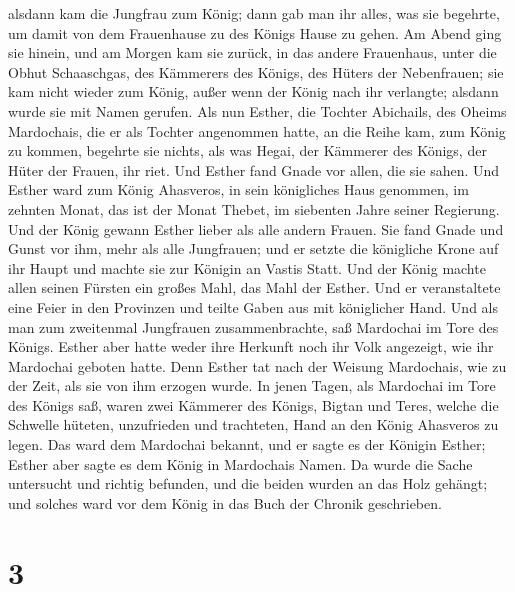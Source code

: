  alsdann kam die Jungfrau zum König; dann gab man ihr
alles, was sie begehrte, um damit von dem Frauenhause zu des Königs
Hause zu gehen.  Am Abend ging sie hinein, und am Morgen
kam sie zurück, in das andere Frauenhaus, unter die Obhut Schaaschgas,
des Kämmerers des Königs, des Hüters der Nebenfrauen; sie kam nicht
wieder zum König, außer wenn der König nach ihr verlangte; alsdann wurde
sie mit Namen gerufen.  Als nun Esther, die Tochter
Abichails, des Oheims Mardochais, die er als Tochter angenommen hatte,
an die Reihe kam, zum König zu kommen, begehrte sie nichts, als was
Hegai, der Kämmerer des Königs, der Hüter der Frauen, ihr riet. Und
Esther fand Gnade vor allen, die sie sahen.  Und Esther
ward zum König Ahasveros, in sein königliches Haus genommen, im zehnten
Monat, das ist der Monat Thebet, im siebenten Jahre seiner Regierung.
 Und der König gewann Esther lieber als alle andern
Frauen. Sie fand Gnade und Gunst vor ihm, mehr als alle Jungfrauen; und
er setzte die königliche Krone auf ihr Haupt und machte sie zur Königin
an Vastis Statt.  Und der König machte allen seinen
Fürsten ein großes Mahl, das Mahl der Esther. Und er veranstaltete eine
Feier in den Provinzen und teilte Gaben aus mit königlicher Hand.
 Und als man zum zweitenmal Jungfrauen zusammenbrachte,
saß Mardochai im Tore des Königs.  Esther aber hatte
weder ihre Herkunft noch ihr Volk angezeigt, wie ihr Mardochai geboten
hatte. Denn Esther tat nach der Weisung Mardochais, wie zu der Zeit, als
sie von ihm erzogen wurde.  In jenen Tagen, als Mardochai
im Tore des Königs saß, waren zwei Kämmerer des Königs, Bigtan und
Teres, welche die Schwelle hüteten, unzufrieden und trachteten, Hand an
den König Ahasveros zu legen.  Das ward dem Mardochai
bekannt, und er sagte es der Königin Esther; Esther aber sagte es dem
König in Mardochais Namen.  Da wurde die Sache untersucht
und richtig befunden, und die beiden wurden an das Holz gehängt; und
solches ward vor dem König in das Buch der Chronik geschrieben.

\hypertarget{section-2}{%
\section{3}\label{section-2}}

